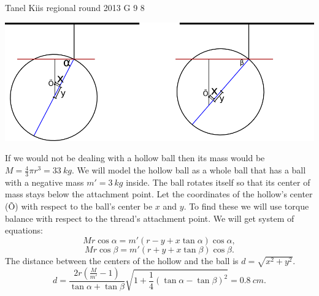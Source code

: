 \documentclass[11pt]{article}
\begin{document}
{Tanel Kiis} %
{regional round} %
{2013} %
{G 9} %
{8} %
{

\ifEngSolution
\begin{center}
\includegraphics[width=\textwidth]{2013-v2g-09-kera}
\end{center}
If we would not be dealing with a hollow ball then its mass would be $M=\frac{4}{3}\pi r^3 = \SI{33}{kg}$. We will model the hollow ball as a whole ball that has a ball with a negative mass $m'=\SI{3}{kg}$ inside. The ball rotates itself so that its center of mass stays below the attachment point. Let the coordinates of the hollow’s center (Õ) with respect to the ball’s center be $x$ and $y$. To find these we will use torque balance with respect to the thread’s attachment point. We will get system of equations:
\[Mr \cos \alpha = m'(r-y+x \tan \alpha) \cos \alpha,\] 
\[Mr \cos \beta = m'(r+y+x \tan \beta) \cos \beta.\]
The distance between the centers of the hollow and the ball is $d=\sqrt{x^2+y^2}$.
\[ d=\frac{2r(\frac{M}{m'}-1)}{\tan\alpha+\tan\beta}\sqrt{1+\frac{1}{4}(\tan\alpha-\tan\beta)^2} = \SI{0,8}{cm}. \]
\fi
}
\end{document}
